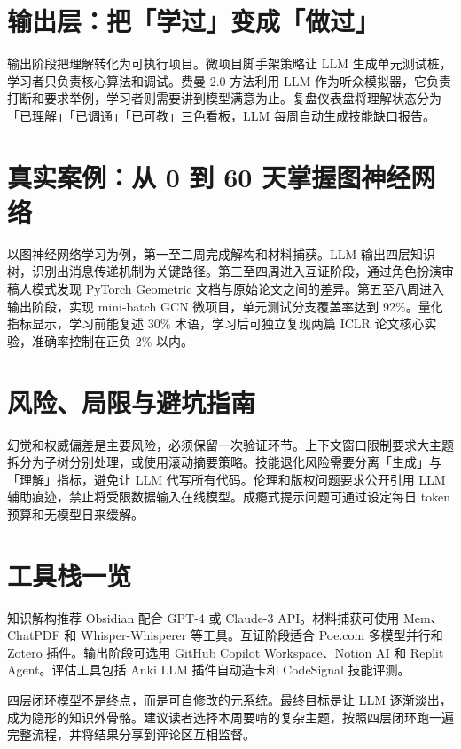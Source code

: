 \chapter{输出层：把「学过」变成「做过」}
输出阶段把理解转化为可执行项目。微项目脚手架策略让 LLM 生成单元测试桩，学习者只负责核心算法和调试。费曼 2.0 方法利用 LLM 作为听众模拟器，它负责打断和要求举例，学习者则需要讲到模型满意为止。复盘仪表盘将理解状态分为「已理解」「已调通」「已可教」三色看板，LLM 每周自动生成技能缺口报告。\par
\chapter{真实案例：从 0 到 60 天掌握图神经网络}
以图神经网络学习为例，第一至二周完成解构和材料捕获。LLM 输出四层知识树，识别出消息传递机制为关键路径。第三至四周进入互证阶段，通过角色扮演审稿人模式发现 PyTorch Geometric 文档与原始论文之间的差异。第五至八周进入输出阶段，实现 mini-batch GCN 微项目，单元测试分支覆盖率达到 92\%{}。量化指标显示，学习前能复述 30\%{} 术语，学习后可独立复现两篇 ICLR 论文核心实验，准确率控制在正负 2\%{} 以内。\par
\chapter{风险、局限与避坑指南}
幻觉和权威偏差是主要风险，必须保留一次验证环节。上下文窗口限制要求大主题拆分为子树分别处理，或使用滚动摘要策略。技能退化风险需要分离「生成」与「理解」指标，避免让 LLM 代写所有代码。伦理和版权问题要求公开引用 LLM 辅助痕迹，禁止将受限数据输入在线模型。成瘾式提示问题可通过设定每日 token 预算和无模型日来缓解。\par
\chapter{工具栈一览}
知识解构推荐 Obsidian 配合 GPT-4 或 Claude-3 API。材料捕获可使用 Mem、ChatPDF 和 Whisper-Whisperer 等工具。互证阶段适合 Poe.com 多模型并行和 Zotero 插件。输出阶段可选用 GitHub Copilot Workspace、Notion AI 和 Replit Agent。评估工具包括 Anki LLM 插件自动造卡和 CodeSignal 技能评测。\par
四层闭环模型不是终点，而是可自修改的元系统。最终目标是让 LLM 逐渐淡出，成为隐形的知识外骨骼。建议读者选择本周要啃的复杂主题，按照四层闭环跑一遍完整流程，并将结果分享到评论区互相监督。\par
